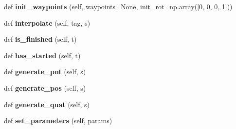 \begin{DoxyCompactItemize}
def {\bfseries init\+\_\+waypoints} (self, waypoints=None, init\+\_\+rot=np.\+array(\mbox{[}0, 0, 0, 1\mbox{]}))
\item 
\mbox{\label{classuuv__trajectory__generator_1_1path__generator_1_1path__generator_1_1PathGenerator_af17568dc4a278acb92081d4d872be18d}} 
def {\bfseries interpolate} (self, tag, s)
\item 
\mbox{\label{classuuv__trajectory__generator_1_1path__generator_1_1path__generator_1_1PathGenerator_a7e96bd04c10f82ffd2463b5e0ed104b9}} 
def {\bfseries is\+\_\+finished} (self, t)
\item 
\mbox{\label{classuuv__trajectory__generator_1_1path__generator_1_1path__generator_1_1PathGenerator_aa62c0ca42aeb9970aa8cbbaced6830b2}} 
def {\bfseries has\+\_\+started} (self, t)
\item 
\mbox{\label{classuuv__trajectory__generator_1_1path__generator_1_1path__generator_1_1PathGenerator_a3a37a23345d8289b985737e0d73c6ca0}} 
def {\bfseries generate\+\_\+pnt} (self, s)
\item 
\mbox{\label{classuuv__trajectory__generator_1_1path__generator_1_1path__generator_1_1PathGenerator_a7aab3401a71c8d4bef2d6e279f36f3b5}} 
def {\bfseries generate\+\_\+pos} (self, s)
\item 
\mbox{\label{classuuv__trajectory__generator_1_1path__generator_1_1path__generator_1_1PathGenerator_a8e914cc5d5df4bf3a5c27db9edb082dd}} 
def {\bfseries generate\+\_\+quat} (self, s)
\item 
\mbox{\label{classuuv__trajectory__generator_1_1path__generator_1_1path__generator_1_1PathGenerator_a0648aa979518d6a1ebaff5f2e27eeb67}} 
def {\bfseries set\+\_\+parameters} (self, params)
\end{DoxyCompactItemize}
